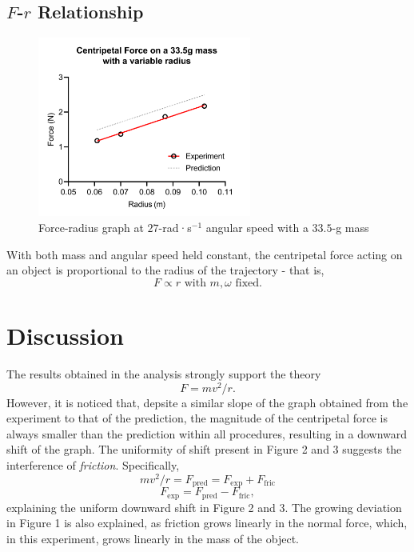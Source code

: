 \subsection{$F$-$r$ Relationship}
\begin{figure}[H]
	\centering\includegraphics[width=7cm]{fr}
	\caption{Force-radius graph at $27$-rad·s$^{-1}$ angular speed with a $33.5$-g mass}
	\label{$Frequency-Intensity$ Graph for $70$cm tube}
\end{figure}
With both mass and angular speed held constant, the centripetal force acting on an object is proportional to  the radius of the trajectory - that is, $$F\propto r\text{         with } m,\omega \text{ fixed.}$$


\section{Discussion}
The results obtained in the analysis strongly support the theory $$
F = mv^2/r. $$
However, it is noticed that, depsite a similar slope of the graph obtained from the experiment to that of the prediction, the magnitude of the centripetal force is always smaller than the prediction within all procedures, resulting in a downward shift of the graph. The uniformity of shift present in Figure 2 and 3 suggests the interference	 of \emph{friction}. Specifically,
$$mv^2/r=F_{\text{pred}}=F_{\text{exp}}+F_{\text{fric}}$$
$$
F_{\text{exp}}=F_{\text{pred}}-F_{\text{fric}},
$$
explaining the uniform downward shift in Figure 2 and 3. The growing deviation in Figure 1 is also explained, as friction grows linearly in the normal force, which, in this experiment, grows linearly in the mass of the object.







